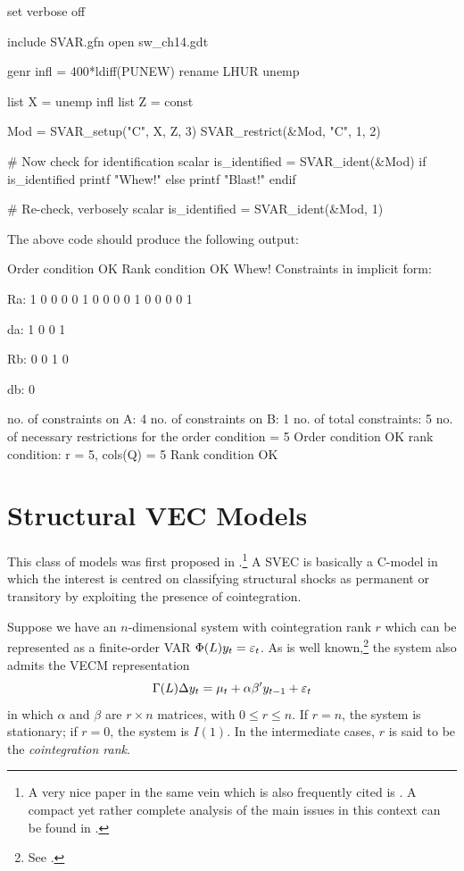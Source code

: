\documentclass[a4paper,10pt]{article}
\newcommand{\PrE}[1]{\ensuremath \varepsilon_{#1}}
\newcommand{\VarSym}{\ensuremath \Phi}
\begin{document}
\begin{code}
set verbose off

include SVAR.gfn
open sw_ch14.gdt

genr infl = 400*ldiff(PUNEW)
rename LHUR unemp

list X = unemp infl
list Z = const

Mod = SVAR_setup("C", X, Z, 3)
SVAR_restrict(&Mod, "C", 1, 2)

# Now check for identification
scalar is_identified = SVAR_ident(&Mod)
if is_identified
    printf "Whew!\n"
else
    printf "Blast!\n"
endif

# Re-check, verbosely
scalar is_identified = SVAR_ident(&Mod, 1)
\end{code}

The above code should produce the following output:

\begin{code}
Order condition OK
Rank condition OK
Whew!
Constraints in implicit form:

Ra:
   1   0   0   0
   0   1   0   0
   0   0   1   0
   0   0   0   1

da:
   1
   0
   0
   1

Rb:
   0   0   1   0

db:
   0

no. of constraints on A: 4
no. of constraints on B: 1
no. of total constraints: 5
no. of necessary restrictions for the order condition = 5
Order condition OK
rank condition: r = 5, cols(Q) = 5
Rank condition OK
\end{code}

\section{Structural VEC Models}
\label{sec:SVECs}

This class of models was first proposed in \cite{KPSW91}.\footnote{A
  very nice paper in the same vein which is also frequently cited is
  \cite{GoNg2001}. A compact yet rather complete analysis of the main
  issues in this context can be found in \cite{Lut06}.} A SVEC is
basically a C-model in which the interest is centred on classifying
structural shocks as permanent or transitory by exploiting the
presence of cointegration.

Suppose we have an $n$-dimensional system with cointegration rank $r$
which can be represented as a finite-order VAR $\VarSym(L) y_t =
\PrE{t}$. As is well known,\footnote{See \cite{joha-book}.} the system
also admits the VECM representation
\begin{equation}
  \label{eq:VECM}
  \Gamma(L) \Delta y_t = \mu_t + \alpha \beta' y_{t-1} + \PrE{t}
\end{equation}
in which $\alpha$ and $\beta$ are $r \times n$ matrices, with $0 \le r
\le n$. If $r=n$, the system is stationary; if $r=0$, the system is
$I(1)$. In the intermediate cases, $r$ is said to be the
\emph{cointegration rank}.
\end{document}
